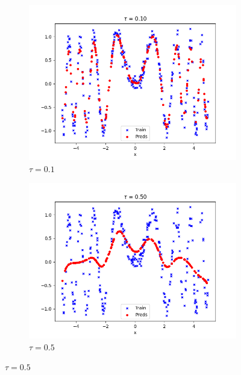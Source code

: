 \begin{answer}
\begin{figure}[H]
  \begin{subfigure}[b]{0.48\textwidth}
    \includegraphics[width=\textwidth]{lwr/tau=0.1.png}
    \caption*{\(\tau = 0.1\)}
  \end{subfigure}
  \hfill
  \begin{subfigure}[b]{0.48\textwidth}
    \includegraphics[width=\textwidth]{lwr/tau=0.5.png}
    \caption*{\(\tau = 0.5\)}
  \end{subfigure}

  \vspace{0.02\textheight} %


\end{figure}
\end{answer}
